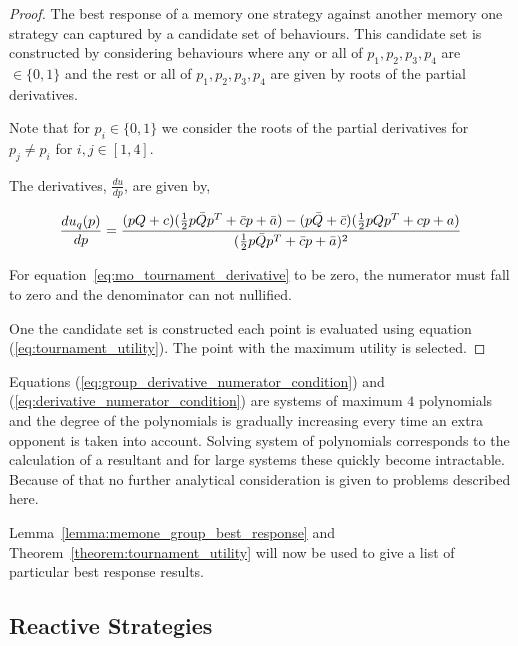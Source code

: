 \documentclass[10pt]{article}
\begin{document}
\begin{proof} The best response of a memory one strategy against another memory
    one strategy can captured by a candidate set of behaviours. This candidate
    set is constructed by considering behaviours where any or all of \(p_1, p_2, p_3, p_4\)
    are \(\in \{0, 1\}\) and the rest or all of \(p_1, p_2, p_3, p_4\) are given by
    roots of the partial derivatives.

    Note that for \(p_i \in \{0, 1\}\) we consider the roots of the partial derivatives
    for \(p_j \neq p_i\) for \(i,j \in [1, 4]\).

    The derivatives, \(\frac{du}{dp}\), are given by,

    \begin{equation}\label{eq:mo_derivative}
        \frac{du_q (p)}{dp}  = \frac{(pQ + c) ( \frac{1}{2} p  \bar{Q}  p^T + \bar{c}  p + \bar{a}) 
        - (p\bar{Q} + \bar{c})( \frac{1}{2} p  Q  p^T + c p + a)}
          {( \frac{1}{2} p  \bar{Q}  p^T + \bar{c}  p + \bar{a})^2} \\
    \end{equation}
    

    For equation~\ref{eq:mo_tournament_derivative} to be zero, the numerator must fall
    to zero and the denominator can not nullified.

    One the candidate set is constructed each point is evaluated using equation
    (\ref{eq:tournament_utility}). The point with the maximum utility is selected.
\end{proof}

Equations (\ref{eq:group_derivative_numerator_condition}) and (\ref{eq:derivative_numerator_condition})
are systems of maximum \(4\) polynomials and the degree of the polynomials is gradually increasing
every time an extra opponent is taken into account. Solving system of polynomials corresponds
to the calculation of a resultant and for large systems these quickly become intractable.
Because of that no further analytical consideration is given to problems described
here.

Lemma~\ref{lemma:memone_group_best_response} and Theorem~\ref{theorem:tournament_utility}
will now be used to give a list of particular best response results.

\subsection{Reactive Strategies}\label{section:reactive_analytical}
\end{document}
